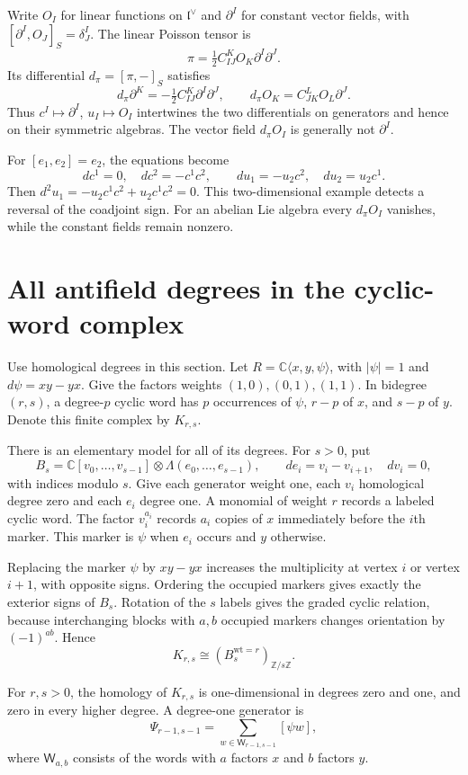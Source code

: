 Write $O_I$ for linear functions on $\mathfrak l^\vee$ and
$\partial^I$ for constant vector fields, with
$[\partial^I,O_J]_S=\delta^I_J$. The linear Poisson tensor is
\[
 \pi=\tfrac12 C^K_{IJ}O_K\partial^I\partial^J.
\]
Its differential $d_\pi=[\pi,-]_S$ satisfies
\[
 d_\pi\partial^K=-\tfrac12C^K_{IJ}\partial^I\partial^J,
 \qquad d_\pi O_K=C^L_{JK}O_L\partial^J.
\]
Thus $c^I\mapsto\partial^I$, $u_I\mapsto O_I$ intertwines the
two differentials on generators and hence on their symmetric
algebras. The vector field $d_\pi O_I$ is generally not
$\partial^I$.

For $[e_1,e_2]=e_2$, the equations become
\[
 dc^1=0,\quad dc^2=-c^1c^2,
 \qquad du_1=-u_2c^2,\quad du_2=u_2c^1.
\]
Then $d^2u_1=-u_2c^1c^2+u_2c^1c^2=0$.
This two-dimensional example detects a reversal of the coadjoint
sign. For an abelian Lie algebra every $d_\pi O_I$ vanishes, while
the constant fields remain nonzero.

\section{All antifield degrees in the cyclic-word complex}

Use homological degrees in this section. Let
$R=\mathbb C\langle x,y,\psi\rangle$, with $|\psi|=1$ and
$d\psi=xy-yx$. Give the factors weights $(1,0),(0,1),(1,1)$.
In bidegree $(r,s)$, a degree-$p$ cyclic word has $p$ occurrences
of $\psi$, $r-p$ of $x$, and $s-p$ of $y$. Denote this finite
complex by $K_{r,s}$.

There is an elementary model for all of its degrees. For $s>0$,
put
\[
 B_s=\mathbb C[v_0,\ldots,v_{s-1}]
       \otimes\Lambda(e_0,\ldots,e_{s-1}),
 \qquad de_i=v_i-v_{i+1},\quad dv_i=0,
\]
with indices modulo $s$. Give each generator weight one, each
$v_i$ homological degree zero and each $e_i$ degree one. A
monomial of weight $r$ records a labeled cyclic word. The factor
$v_i^{a_i}$ records $a_i$ copies of $x$ immediately before the
$i$th marker. This marker is $\psi$ when $e_i$ occurs and $y$ otherwise.

Replacing the marker $\psi$ by $xy-yx$ increases the multiplicity
at vertex $i$ or vertex $i+1$, with opposite signs. Ordering the
occupied markers gives exactly the exterior signs of $B_s$.
Rotation of the $s$ labels gives the graded cyclic relation,
because interchanging blocks with $a,b$ occupied markers changes
orientation by $(-1)^{ab}$. Hence
\[
 K_{r,s}\cong (B_s^{\mathrm{wt}=r})_{\mathbb Z/s\mathbb Z}.
\]

\begin{proposition}\label{mht:prop:cyclic-koszul-circle}
For $r,s>0$, the homology of $K_{r,s}$ is one-dimensional in
degrees zero and one, and zero in every higher degree. A
degree-one generator is
\[
 \Psi_{r-1,s-1}
   =\sum_{w\in\mathsf W_{r-1,s-1}}[\psi w],
\]
where $\mathsf W_{a,b}$ consists of the words with $a$ factors
$x$ and $b$ factors $y$.
\end{proposition}

